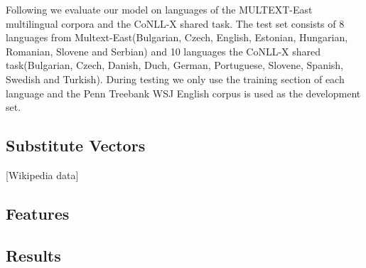 Following \cite{christodoulopoulos-goldwater-steedman:2011:EMNLP} we
evaluate our model on languages of the MULTEXT-East\cite{Multext}
multilingual corpora and the CoNLL-X\cite{conll} shared task.  The
test set consists of 8 languages from Multext-East(Bulgarian, Czech,
English, Estonian, Hungarian, Romanian, Slovene and Serbian) and 10
languages the CoNLL-X shared task(Bulgarian, Czech, Danish, Duch,
German, Portuguese, Slovene, Spanish, Swedish and Turkish).  During
testing we only use the training section of each language
\cite{Lee:2010:STU:1870658.1870741} and the Penn Treebank WSJ English
corpus is used as the development set.

\subsection{Substitute Vectors}
[Wikipedia data]
\subsection{Features}
\subsection{Results}


